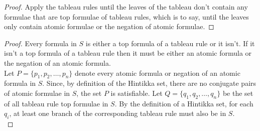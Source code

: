 \documentclass[../MathsNotesBase.tex]{subfiles}
\begin{document}
{ 		
 		\nl[12]
 		\nl
 		
 		
 		
 		
 		
 		\biggerskip
 		\begin{proof}
 			Apply the tableau rules until the leaves of the tableau don't contain any formulae that are top formulae of tableau rules, which is to say, until the leaves only contain atomic formulae or the negation of atomic formulae.
 		\end{proof}
 	
 		\bigskip
 		\begin{proof}
 			Every formula in $S$ is either a top formula of a tableau rule or it isn't. If it isn't a top formula of a tableau rule then it must be either an atomic formula or the negation of an atomic formula.\\
 			
 			Let ${ P = \{p_1, p_2, \dots, p_n\} }$ denote every atomic formula or negation of an atomic formula in $S$. Since, by definition of the Hintikka set, there are no conjugate pairs of atomic formulae in $S$, the set $P$ is satisfiable. Let ${ Q = \{q_1, q_2, \dots, q_n\} }$ be the set of all tableau rule top formulae in $S$. By the definition of a Hintikka set, for each $q_i$, at least one branch of the corresponding tableau rule must also be in $S$.\\
 			

\end{proof}}
\end{document}
